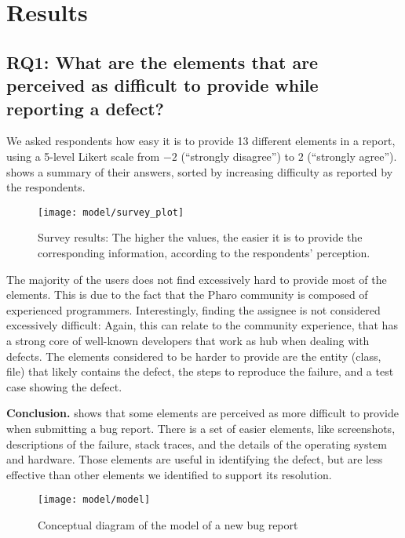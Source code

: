 \section{Results} \label{sec:approach}

\subsection*{RQ1: What are the elements that are perceived as difficult to provide while reporting a defect?}

We asked respondents how easy it is to provide 13 different elements in a report, using a 5-level Likert scale from $-2$ (``strongly disagree'') to $2$ (``strongly agree'').  shows a summary of their answers, sorted by increasing difficulty as reported by the respondents.
\begin{figure}[h!]
\centering
\texttt{[image: model/survey\_plot]}
\label{fig:survey}
\caption{Survey results: The higher the values, the easier it is to provide the corresponding information, according to the respondents' perception.}
\end{figure}
The majority of the users does not find excessively hard to provide most of the elements. This is due to the fact that the Pharo community is composed of experienced programmers. Interestingly, finding the assignee is not considered excessively difficult: Again, this can relate to the community experience, that has a strong core of well-known developers that work as hub when dealing with defects. The elements considered to be harder to provide are the entity (\eg class, file) that likely contains the defect, the steps to reproduce the failure, and a test case showing the defect.

\textbf{Conclusion.}  shows that some elements are perceived as more difficult to provide when submitting a bug report. There is a set of easier elements, like screenshots, descriptions of the failure, stack traces, and the details of the operating system and hardware. Those elements are useful in identifying the defect, but are less effective than other elements we identified to support its resolution.


\begin{figure*}[ht]
\centering
\texttt{[image: model/model]}
\caption{Conceptual diagram of the model of a new bug report}
\label{fig:model}
\end{figure*}

